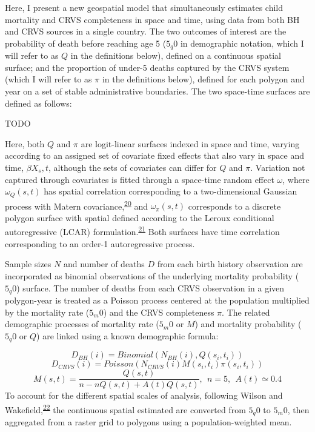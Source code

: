 \documentclass[
]{article}
\begin{document}
Here, I present a new geospatial model that simultaneously estimates child mortality and CRVS completeness in space and time, using data from both BH and CRVS sources in a single country. The two outcomes of interest are the probability of death before reaching age 5 (\(5_q0\) in demographic notation, which I will refer to as \(Q\) in the definitions below), defined on a continuous spatial surface; and the proportion of under-5 deaths captured by the CRVS system (which I will refer to as \(\pi\) in the definitions below), defined for each polygon and year on a set of stable administrative boundaries. The two space-time surfaces are defined as follows:

TODO

Here, both \(Q\) and \(\pi\) are logit-linear surfaces indexed in space and time, varying according to an assigned set of covariate fixed effects that also vary in space and time, \(\beta X_s,t\), although the sets of covariates can differ for \(Q\) and \(\pi\). Variation not captured through covariates is fitted through a space-time random effect \(\omega\), where \(\omega_Q(s,t)\) has spatial correlation corresponding to a two-dimensional Gaussian process with Matern covariance,\textsuperscript{\protect\hyperlink{ref-Miller2020}{20}} and \(\omega_\pi(s,t)\) corresponds to a discrete polygon surface with spatial defined according to the Leroux conditional autoregressive (LCAR) formulation.\textsuperscript{\protect\hyperlink{ref-Riebler2016}{21}} Both surfaces have time correlation corresponding to an order-1 autoregressive process.

Sample sizes \(N\) and number of deaths \(D\) from each birth history observation are incorporated as binomial observations of the underlying mortality probability (\(5_q0\)) surface. The number of deaths from each CRVS observation in a given polygon-year is treated as a Poisson process centered at the population multiplied by the mortality rate (\(5_m0\)) and the CRVS completeness \(\pi\). The related demographic processes of mortality rate (\(5_m0\) or \(M\)) and mortality probability (\(5_q0\) or \(Q\)) are linked using a known demographic formula:

\[D_{BH}(i) = Binomial(N_{BH}(i), Q(s_i, t_i))\]
\[D_{CRVS}(i) = Poisson(N_{CRVS}(i)M(s_i, t_i)\pi(s_i, t_i))\]
\[M(s,t) = \dfrac{Q(s,t)}{n - nQ(s,t) + A(t)Q(s,t)},~~n = 5,~~A(t) \simeq 0.4\]
To account for the different spatial scales of analysis, following Wilson and Wakefield,\textsuperscript{\protect\hyperlink{ref-Wilson2018}{22}} the continuous spatial estimated are converted from \(5_q0\) to \(5_m0\), then aggregated from a raster grid to polygons using a population-weighted mean.
\end{document}
